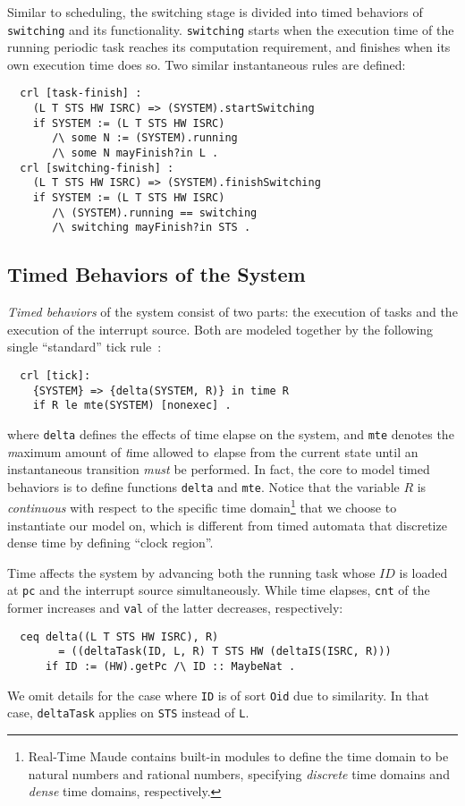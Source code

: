 \documentclass{llncs}
\begin{document}
Similar to scheduling, the switching stage is divided into timed
behaviors of \verb|switching| and its functionality. \verb|switching|
starts when the execution time of the running periodic task reaches
its computation requirement, and finishes when its own execution time
does so. Two similar instantaneous rules are defined:
\begin{verbatim}
  crl [task-finish] :
    (L T STS HW ISRC) => (SYSTEM).startSwitching
    if SYSTEM := (L T STS HW ISRC)
       /\ some N := (SYSTEM).running
       /\ some N mayFinish?in L .
  crl [switching-finish] :
    (L T STS HW ISRC) => (SYSTEM).finishSwitching
    if SYSTEM := (L T STS HW ISRC)
       /\ (SYSTEM).running == switching
       /\ switching mayFinish?in STS .
\end{verbatim}

\subsection{Timed Behaviors of the System}
\label{ss:timedbehavior}
\emph{Timed behaviors} of the system consist of two parts: the
execution of tasks and the execution of the interrupt source. Both are
modeled together by the following single ``standard'' tick
rule~\cite{DBLP:journals/entcs/OlveczkyM07a}:
\begin{verbatim}
  crl [tick]:
    {SYSTEM} => {delta(SYSTEM, R)} in time R 
    if R le mte(SYSTEM) [nonexec] .
\end{verbatim}
where \verb|delta| defines the effects of time elapse on the system,
and \verb|mte| denotes the \emph{m}aximum amount of \emph{t}ime
allowed to \emph{e}lapse from the current state until an instantaneous
transition \emph{must} be performed. In fact, the core to model timed
behaviors is to define functions \verb|delta| and \verb|mte|. Notice
that the variable $R$ is \emph{continuous} with respect to the
specific time domain\footnote{Real-Time Maude contains built-in
  modules to define the time domain to be natural numbers and rational
  numbers, specifying \emph{discrete} time domains and \emph{dense}
  time domains, respectively.}  that we choose to instantiate our
model on, which is different from timed automata that discretize dense
time by defining ``clock region''.

Time affects the system by advancing both the running task whose $ID$
is loaded at \verb|pc| and the interrupt source simultaneously.  While
time elapses, \verb|cnt| of the former increases and \verb|val| of the
latter decreases, respectively:
\begin{verbatim}
  ceq delta((L T STS HW ISRC), R)
        = ((deltaTask(ID, L, R) T STS HW (deltaIS(ISRC, R)))
      if ID := (HW).getPc /\ ID :: MaybeNat .
\end{verbatim}
We omit details for the case where \verb|ID| is of sort \verb|Oid| due
to similarity. In that case, \verb|deltaTask| applies on \verb|STS|
instead of \verb|L|.
\end{document}
